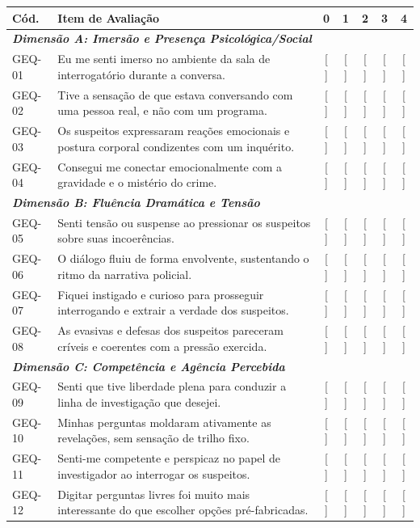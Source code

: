 \begin{center}
\small
\renewcommand{\arraystretch}{0.92}
\label{tab:itens_geq}
\begin{tabularx}{\textwidth}{lXccccc}
\toprule
\textbf{Cód.} & \textbf{Item de Avaliação} & \textbf{0} & \textbf{1} & \textbf{2} & \textbf{3} & \textbf{4} \\
\midrule
\multicolumn{7}{l}{\textit{\textbf{Dimensão A: Imersão e Presença Psicológica/Social}}} \\
GEQ-01 & Eu me senti imerso no ambiente da sala de interrogatório durante a conversa. & [ ] & [ ] & [ ] & [ ] & [ ] \\
GEQ-02 & Tive a sensação de que estava conversando com uma pessoa real, e não com um programa. & [ ] & [ ] & [ ] & [ ] & [ ] \\
GEQ-03 & Os suspeitos expressaram reações emocionais e postura corporal condizentes com um inquérito. & [ ] & [ ] & [ ] & [ ] & [ ] \\
GEQ-04 & Consegui me conectar emocionalmente com a gravidade e o mistério do crime. & [ ] & [ ] & [ ] & [ ] & [ ] \\
\midrule
\multicolumn{7}{l}{\textit{\textbf{Dimensão B: Fluência Dramática e Tensão}}} \\
GEQ-05 & Senti tensão ou suspense ao pressionar os suspeitos sobre suas incoerências. & [ ] & [ ] & [ ] & [ ] & [ ] \\
GEQ-06 & O diálogo fluiu de forma envolvente, sustentando o ritmo da narrativa policial. & [ ] & [ ] & [ ] & [ ] & [ ] \\
GEQ-07 & Fiquei instigado e curioso para prosseguir interrogando e extrair a verdade dos suspeitos. & [ ] & [ ] & [ ] & [ ] & [ ] \\
GEQ-08 & As evasivas e defesas dos suspeitos pareceram críveis e coerentes com a pressão exercida. & [ ] & [ ] & [ ] & [ ] & [ ] \\
\midrule
\multicolumn{7}{l}{\textit{\textbf{Dimensão C: Competência e Agência Percebida}}} \\
GEQ-09 & Senti que tive liberdade plena para conduzir a linha de investigação que desejei. & [ ] & [ ] & [ ] & [ ] & [ ] \\
GEQ-10 & Minhas perguntas moldaram ativamente as revelações, sem sensação de trilho fixo. & [ ] & [ ] & [ ] & [ ] & [ ] \\
GEQ-11 & Senti-me competente e perspicaz no papel de investigador ao interrogar os suspeitos. & [ ] & [ ] & [ ] & [ ] & [ ] \\
GEQ-12 & Digitar perguntas livres foi muito mais interessante do que escolher opções pré-fabricadas. & [ ] & [ ] & [ ] & [ ] & [ ] \\
\bottomrule
\end{tabularx}
\end{center}

